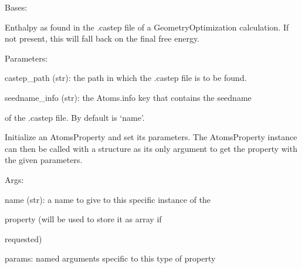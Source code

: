 \documentclass[letterpaper,10pt,english]{sphinxmanual}
\begin{document}
\begin{fulllineitems}
\label{doctree/soprano.properties.castep.castep:soprano.properties.castep.castep.CastepEnthalpy}
Bases: {\hyperref[doctree/soprano.properties.atomsproperty:soprano.properties.atomsproperty.AtomsProperty]{\emph{}}}

Enthalpy as found in the .castep file of a GeometryOptimization
calculation. If not present, this will fall back on the final free energy.

\begin{DUlineblock}{0em}
\item[] Parameters:
\item[]
\begin{DUlineblock}{\DUlineblockindent}
\item[] castep\_path (str): the path in which the .castep file is to be found.
\item[] seedname\_info (str): the Atoms.info key that contains the seedname
\item[]
\begin{DUlineblock}{\DUlineblockindent}
\item[] of the .castep file. By default is `name'.
\end{DUlineblock}
\end{DUlineblock}
\end{DUlineblock}

Initialize an AtomsProperty and set its parameters.
The AtomsProperty instance can then be called with a structure as its
only argument to get the property with the given parameters.

\begin{DUlineblock}{0em}
\item[] Args:
\item[]
\begin{DUlineblock}{\DUlineblockindent}
\item[] name (str): a name to give to this specific instance of the
\item[]
\begin{DUlineblock}{\DUlineblockindent}
\item[] property (will be used to store it as array if
\item[] requested)
\end{DUlineblock}
\item[] params: named arguments specific to this type of property
\end{DUlineblock}
\end{DUlineblock}


\end{fulllineitems}
\end{document}
